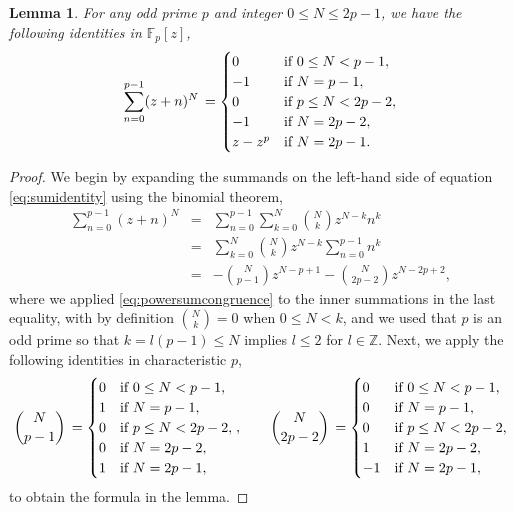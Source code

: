 \documentclass[a4paper,reqno]{amsart}
\numberwithin{equation}{section}
\newtheorem{lemma}[theorem]{Lemma}
\numberwithin{figure}{section}
\theoremstyle{remark}
\begin{document}
\begin{lemma}\label{lemma:z+n}
For any odd prime $p$ and integer $0\leq N\leq 2p-1$, we have the following identities in  $\mathbb{F}_p[z]$,
\begin{equation}\label{eq:sumidentity}
\sum_{n=0}^{p-1}(z+n)^N\, = \begin{cases}
0 &\text{if $0\leq N < p-1$},\\
-1 &\text{if $N=p-1 $},\\
0 &\text{if $p\leq N < 2p-2 $},\\
-1 &\text{if $ N = 2p-2 $},\\
z-z^p &\text{if $N=2p-1 $}.
\end{cases}
\end{equation}
\end{lemma}
\begin{proof}
    We begin by expanding the summands on the left-hand side of equation \eqref{eq:sumidentity} using the binomial theorem,
    \begin{eqnarray}
        \sum_{n=0}^{p-1}(z+n)^N &=& \sum_{n=0}^{p-1} \sum_{k=0}^N \binom{N}{k}z^{N-k}n^k\nonumber \\
        &=& \sum_{k=0}^N \binom{N}{k}z^{N-k} \sum_{n=0}^{p-1} n^k\nonumber\\
        &=&-\binom{N}{p-1}z^{N-p+1}-\binom{N}{2p-2}z^{N-2p+2},\label{eq:2term}
    \end{eqnarray}
  where we applied \eqref{eq:powersumcongruence} to the inner summations in the last equality, with by definition $\binom{N}{k}=0$ when $0\leq N<k$, and we used that $p$ is an odd prime so that
$k=l(p-1)\leq N$ implies $l\leq 2$ for $l\in\mathbb{Z}$.
  Next, we apply the following identities in characteristic $p$,
\begin{equation*}
\binom{N}{p-1}\, = \begin{cases}
0 &\text{if $0\leq N < p-1$},\\
1 &\text{if $N=p-1 $},\\
0 &\text{if $p\leq N < 2p-2 $},\\
0 &\text{if $ N = 2p-2 $},\\
1 &\text{if $N=2p-1 $},
\end{cases},\qquad
\binom{N}{2p-2}\, = \begin{cases}
0 &\text{if $0\leq N < p-1$},\\
0 &\text{if $N=p-1 $},\\
0 &\text{if $p\leq N < 2p-2 $},\\
1 &\text{if $ N = 2p-2 $},\\
-1 &\text{if $N=2p-1 $},
\end{cases}
\end{equation*}
to obtain the formula in the lemma.   
\end{proof}
\end{document}

